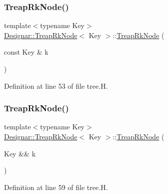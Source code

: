 \subsubsection{\texorpdfstring{Treap\+Rk\+Node()}{TreapRkNode()}\hspace{0.1cm}{\footnotesize\ttfamily [2/4]}}
{\footnotesize\ttfamily template$<$typename Key$>$ \\
\hyperlink{class_designar_1_1_treap_rk_node}{Designar\+::\+Treap\+Rk\+Node}$<$ Key $>$\+::\hyperlink{class_designar_1_1_treap_rk_node}{Treap\+Rk\+Node} (\begin{DoxyParamCaption}\item[{const Key \&}]{k }\end{DoxyParamCaption})\hspace{0.3cm}{\ttfamily [inline]}}



Definition at line 53 of file tree.\+H.

\mbox{\label{class_designar_1_1_treap_rk_node_a81c5eee2937311cfee5b30a03cd16a04}} 
\subsubsection{\texorpdfstring{Treap\+Rk\+Node()}{TreapRkNode()}\hspace{0.1cm}{\footnotesize\ttfamily [3/4]}}
{\footnotesize\ttfamily template$<$typename Key$>$ \\
\hyperlink{class_designar_1_1_treap_rk_node}{Designar\+::\+Treap\+Rk\+Node}$<$ Key $>$\+::\hyperlink{class_designar_1_1_treap_rk_node}{Treap\+Rk\+Node} (\begin{DoxyParamCaption}\item[{Key \&\&}]{k }\end{DoxyParamCaption})\hspace{0.3cm}{\ttfamily [inline]}}



Definition at line 59 of file tree.\+H.

\mbox{\label{class_designar_1_1_treap_rk_node_aeac25432a807225359883033f50404eb}} 
